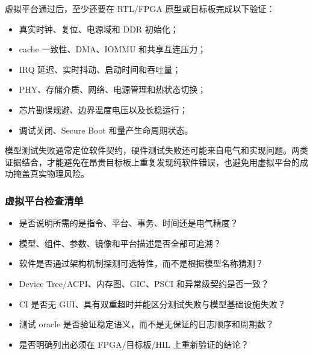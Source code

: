 虚拟平台通过后，至少还要在 RTL/FPGA 原型或目标板完成以下验证：

\begin{itemize}
  \item 真实时钟、复位、电源域和 DDR 初始化；
  \item cache 一致性、DMA、IOMMU 和共享互连压力；
  \item IRQ 延迟、实时抖动、启动时间和吞吐量；
  \item PHY、存储介质、网络、电源管理和热状态切换；
  \item 芯片勘误规避、边界温度电压以及长稳运行；
  \item 调试关闭、Secure Boot 和量产生命周期状态。
\end{itemize}

模型测试失败通常定位软件契约，硬件测试失败还可能来自电气和实现问题。两类证据结合，才能避免在昂贵目标板上重复发现纯软件错误，也避免用虚拟平台的成功掩盖真实物理风险。

\subsubsection{虚拟平台检查清单}

\begin{itemize}
  \item 是否说明所需的是指令、平台、事务、时间还是电气精度？
  \item 模型、组件、参数、镜像和平台描述是否全部可追溯？
  \item 软件是否通过架构机制探测可选特性，而不是根据模型名称猜测？
  \item Device Tree/ACPI、内存图、GIC、PSCI 和异常级契约是否一致？
  \item CI 是否无 GUI、具有双重超时并能区分测试失败与模型基础设施失败？
  \item 测试 oracle 是否验证稳定语义，而不是无保证的日志顺序和周期数？
  \item 是否明确列出必须在 FPGA/目标板/HIL 上重新验证的结论？
\end{itemize}
